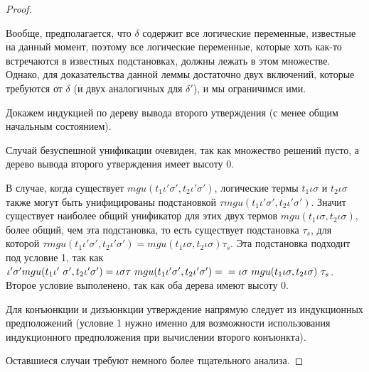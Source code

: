     \begin{proof}$ $\par\nobreak\ignorespaces
      Вообще, предполагается, что $\delta$ содержит все логические переменные, известные на данный момент, поэтому все логические переменные, которые хоть как-то встречаются в известных подстановках, должны лежать в этом множестве. Однако, для доказательства данной леммы достаточно двух включений, которые требуются от $\delta$ (и двух аналогичных для $\delta'$), и мы ограничимся ими.
      
      Докажем индукцией по дереву вывода второго утверждения (с менее общим начальным состоянием).
      
      Случай безуспешной унификации очевиден, так как множество решений пусто, а дерево вывода второго утверждения имеет высоту 0.
      
      В случае, когда существует $mgu(t_1 \iota' \sigma', t_2 \iota' \sigma')$, логические термы $t_1 \iota \sigma$ и $t_2 \iota \sigma$ также могут быть унифицированы подстановкой $\tau mgu(t_1 \iota' \sigma', t_2 \iota' \sigma')$. Значит существует наиболее общий унификатор для этих двух термов $mgu(t_1 \iota \sigma, t_2 \iota \sigma)$, более общий, чем эта подстановка, то есть существует подстановка $\tau_s$, для которой $\tau mgu(t_1 \iota' \sigma', t_2 \iota' \sigma') = mgu(t_1 \iota \sigma, t_2 \iota \sigma) \tau_s$. Эта подстановка подходит под условие 1, так как $\iota' \sigma' mgu(t_1 \iota' \ \sigma', t_2 \iota' \sigma') = \iota \sigma \tau \ mgu(t_1 \iota' \sigma', t_2 \iota' \sigma') = \\ = \iota \sigma \ mgu(t_1 \iota \sigma, t_2 \iota \sigma) \ \tau_s$. Второе условие выполенено, так как оба дерева имеют высоту 0.
      
      Для конъюнкции и дизъюнкции утверждение напрямую следует из индукционных предположений (условие 1 нужно именно для возможности использования индукционного предположения при вычислении второго конъюнкта).
      
      Оставшиеся случаи требуют немного более тщательного анализа.
      

\end{proof}
